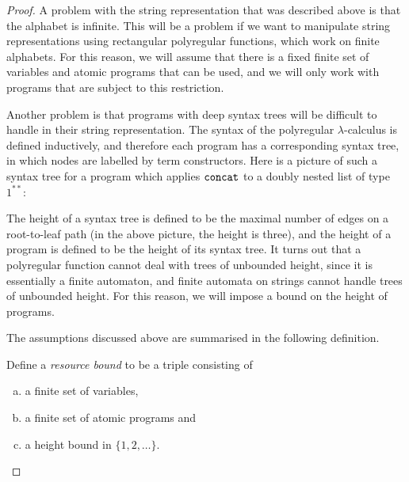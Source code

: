 \documentclass[a4paper,UKenglish,cleveref, autoref, thm-restate]{lipics-v2021}
\newcommand{\set}[1]{\{#1\}}
\begin{document}
\begin{proof}
    A problem with the string representation that was described above is that the alphabet is infinite. This will be a problem if we want to manipulate string representations using rectangular polyregular functions, which work on finite alphabets. For this reason, we will assume that there is a fixed finite set of variables and atomic programs that can be used, and we will only work with programs that are subject to this restriction. 
    
    Another problem is that programs with deep syntax trees will be difficult to handle in their string representation. The syntax of the polyregular $\lambda$-calculus is defined inductively, and therefore each program has a corresponding syntax tree, in which nodes are labelled by term constructors. Here is a picture of such a syntax tree for a program which applies $\mathtt{concat}$ to a doubly nested list of type $1^{**}$:
  \begin{center}
\end{center}
    The height of a syntax tree is defined to be the maximal number of edges on a root-to-leaf path (in the above picture, the height is three), and the height of a program is defined to be the height of its syntax tree.
    It turns out that a polyregular function cannot  deal with trees of unbounded height, since it is essentially a finite automaton, and finite automata on strings cannot handle trees of unbounded height. For this reason, we will impose a bound on the height of programs. 

The assumptions discussed above are summarised  in the following definition.

    \begin{definition}
        Define a \emph{resource bound} to be a triple consisting of
        \begin{enumerate}[(a)]
\item  a finite set of variables,
\item a finite set of atomic programs and 
\item a height bound in $\set{1,2,\ldots}$. 
\end{enumerate}       
    \end{definition}
    

\end{proof}
\end{document}
